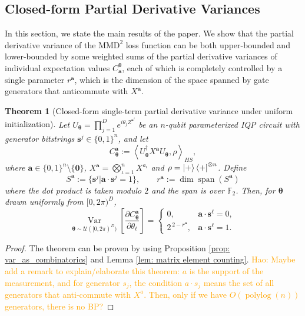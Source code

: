 \documentclass[a4paper,onecolumn,notitlepage,nofootinbib,longbibliography,superscriptaddress, floatfix, pra, aps, 10pt]{revtex4-2}
\newcommand{\inner}[2]{\left\langle #1, #2 \right\rangle}
\newcommand{\vttheta}{{\bm{\theta}}}
\newcommand{\vta}{{\bm{a}}}
\newcommand{\vtsj}{{\bm{s}^j}}
\newcommand{\vtsl}{{\bm{s}^\ell}}
\newtheorem{theorem}{Theorem}
\newcommand\hw[1]{\textcolor{orange}{Hao: #1}}
\begin{document}
\subsection{Closed-form Partial Derivative Variances}
In this section, we state the main results of the paper. We show that the partial derivative variance of the $\text{MMD}^2$ loss function can be both upper-bounded and lower-bounded by some weighted sums of the partial derivative variances of individual expectation values $C^\vttheta_\vta$, each of which is completely controlled by a single parameter $r^\vta$, which is the dimension of the space spanned by gate generators that anticommute with $X^\vta$.
\begin{theorem}[Closed-form single-term partial derivative variance under uniform initialization]
\label{thm:grad-var-single-observable}
Let $U_\vttheta = \prod_{j=1}^D e^{i \theta_j Z^\vtsj}$ be an $n$-qubit parameterized IQP circuit with generator
bitstrings $\vtsj \in \{0,1\}^n$, and let
\begin{equation}
    C^\vta_\vttheta := 
    \inner{U_\vttheta^\dagger X^{\vta}U_\vttheta}{\rho }_{HS}, 
\end{equation}
where $\vta \in \{0,1\}^n \setminus \{\mathbf{0}\}$, $X^\vta = \bigotimes_{\iota=1}^n X^{a_\iota}$ and $\rho = \ket{+}\bra{+}^{\otimes n}$.
Define
\begin{equation}
S^{\vta} := \{ \vtsj \big| \vta \cdot \vtsj = 1 \},
\qquad
r^\vta := \dim \operatorname{span}\left( S^{\vta} \right)    
\end{equation}
where the dot product is taken modulo $2$ and the span is over $\mathbb{F}_2$.
Then, for $\vttheta$ drawn uniformly from $[0,2\pi)^D$,
\begin{equation}
\operatorname*{Var}_{\vttheta \sim \mathcal{U}([0,2\pi)^D)} \left[ \frac{\partial C^\vta_\vttheta}{\partial \theta_\ell} \right]
=
\begin{cases}
0, & \vta \cdot \vtsl = 0,\\
2^{\,2-r^\vta}, & \vta \cdot \vtsl = 1.
\end{cases}
\end{equation}
\end{theorem}
\begin{proof}
The theorem can be proven by using Proposition \ref{prop: var_as_combinatorics} and Lemma \ref{lem: matrix element counting}.
\hw{Maybe add a remark to explain/elaborate this theorem: $a$ is the support of the measurement, and for generator $s_j$, the condition $a \cdot s_j$ means the set of all generators that anti-commute with $X^a$. Then, only if we have $O(\operatorname{polylog}(n))$ generators, there is no BP?}
\end{proof}
\end{document}
